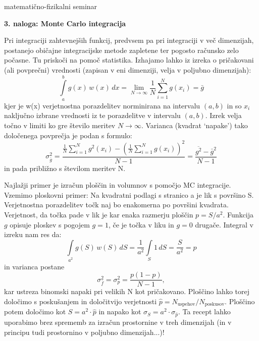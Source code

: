 \documentclass[12pt]{article}
\begin{document}
\thispagestyle{empty}


\setcounter{equation}{0}
\centerline{\sc matematično-fizikalni seminar~\thisyear}
\bigskip
\setcounter{equation}{0}
\centerline{\bf 3. naloga: Monte Carlo integracija}
\bigskip
\bigskip

Pri integraciji zahtevnejših funkcij, predvsem pa pri integraciji v več dimenzijah, 
postanejo običajne integracijske metode zapletene ter pogosto računsko zelo počasne. 
Tu priskoči na pomoč statistika. Izhajamo lahko iz izreka
o pričakovani (ali povprečni) vrednosti (zapisan v eni dimenziji, velja v poljubno dimenzijah):
\begin{equation}
\int\limits_{a}^{b} g(x)\, w(x)\, dx = \lim\limits_{N \rightarrow \infty} \frac{1}{N}
\sum\limits_{i=1}^{N} g(x_i) = \bar{g}
\end{equation}
kjer je w(x) verjetnostna porazdelitev norminirana na intervalu
$(a,b)$ in so $x_i$ naključno izbrane vrednosti iz te porazdelitve v intervalu $(a,b)$.
Izrek velja točno v limiti ko gre število meritev  $N \to \infty$.
Varianca (kvadrat `napake') tako določenega povprečja je podan s
formulo:
\begin{equation}
\sigma^2_{\bar{g}} = \frac{ \frac{1}{N}\sum\limits_{i=1}^{N} g^2(x_i) -
  (\frac{1}{N} \sum\limits_{i=1}^{N} g(x_i))^2}{N-1} = \frac{\overline{g^2} - \bar{g}^2}{N-1}
  \label{eq:var}
\end{equation}
in pada približno s številom meritev N.

Najlažji primer je izračun ploščin in volumnov s pomočjo
MC integracije. Vzemimo ploskovni primer: Na kvadratni podlagi s
stranico a je lik s površino S. Verjetnostna porazdelitev točk
naj bo enakomerna po površini kvadrata. Verjetnost, da točka
pade v lik je kar enaka razmerju ploščin $p=S/a^2$. Funkcija $g$
opisuje ploskev s pogojem $g =1$, če je točka v liku in $g=0$
drugače. Integral v izreku nam res da:
\begin{equation}
\int\limits_{a^2} g(S)\, w(S)\, dS = \frac{1}{a^2} \int\limits_{S} 1
\, dS  = \frac{S}{a^2} = p
\end{equation}
in varianca postane
\begin{equation}
\sigma^2_{\bar{f}} = \sigma^2_{p} = \frac{p(1-p)}{N-1},
\end{equation}
kar ustreza binomski napaki pri velikih N kot pričakovano. Ploščino lahko torej določimo
s poskušanjem in določitvijo verjetnosti $\hat{p}=N_{\mathrm{uspehov}}/N_{\mathrm{poskusov}}$. 
Ploščino potem določimo kot $S=a^2\cdot \hat{p}$ in napako kot  
$\sigma_S = a^2\cdot \sigma_{\hat{p}}$. Ta recept lahko uporabimo brez sprememb za izračun 
prostornine v treh dimenzijah (in v principu tudi prostornino v poljubno dimenzijah...)!
\end{document}
